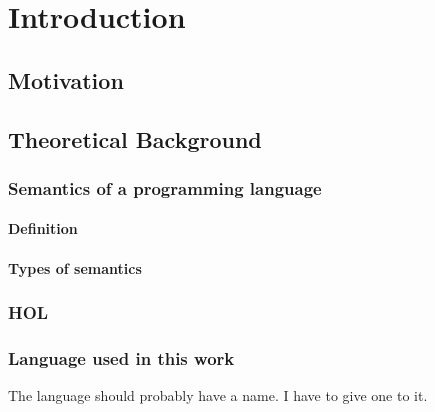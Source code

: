 \chapter{Introduction}\label{chapter:introduction}

\section{Motivation}
\section{Theoretical Background}

\subsection{Semantics of a programming language}
\subsubsection{Definition}
\subsubsection{Types of semantics}

\subsection{HOL}

\subsection{Language used in this work}
The language should probably have a name.
I have to give one to it.
